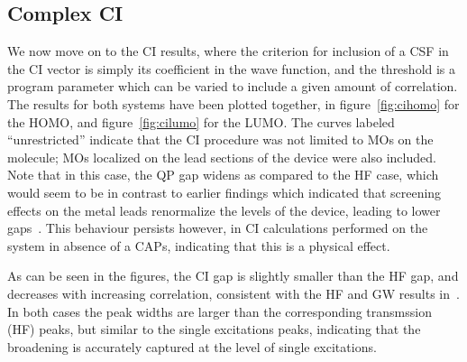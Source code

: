 \subsection{Complex \ac{CI}}

We now move on to the \ac{CI} results, where the criterion for inclusion of a
\ac{CSF} in the \ac{CI} vector is simply its coefficient in the wave function,
and the threshold is a program parameter which can be varied to include a given
amount of correlation. The results for both systems have been plotted together,
in figure~\ref{fig:cihomo} for the \ac{HOMO}, and figure~\ref{fig:cilumo}
for the \ac{LUMO}. The curves labeled ``unrestricted'' indicate that the \ac{CI}
procedure was not limited to MOs on the molecule; MOs localized on the lead
sections of the device were also included. Note that in this case, the QP gap
widens as compared to the HF case, which would seem to be in contrast to
earlier findings which indicated that screening effects on the metal leads
renormalize the levels of the device, leading to lower
gaps~\cite{thygesen_rubio, thygesen}. This behaviour persists however, in
\ac{CI} calculations performed on the system in absence of a \acp{CAP},
indicating that this is a physical effect.

As can be seen in the figures, the \ac{CI} gap is slightly smaller than the HF
gap, and decreases with increasing correlation, consistent with the HF and GW
results in~\cite{thygesen_rubio, thygesenrubio2010corr}. In both cases the peak
widths are larger than the corresponding transmssion (HF) peaks, but similar
to the single excitations peaks, indicating that the broadening is accurately
captured at the level of single excitations.

